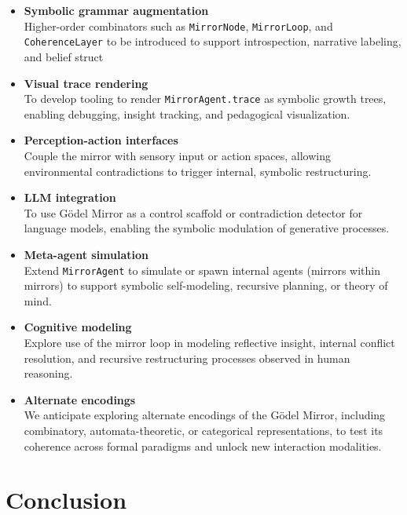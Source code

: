 \documentclass[manuscript,nonacm]{acmart}
\begin{document}
\begin{itemize}
\item \textbf{Symbolic grammar augmentation}\\
    Higher-order combinators such as \texttt{MirrorNode}, \texttt{MirrorLoop}, and \texttt{CoherenceLayer} to be introduced to support introspection, narrative labeling, and belief struct
    
\item \textbf{Visual trace rendering}\\
    To develop tooling to render \texttt{MirrorAgent.trace} as symbolic growth trees, enabling debugging, insight tracking, and pedagogical visualization.
    
\item \textbf{Perception-action interfaces}\\
    Couple the mirror with sensory input or action spaces, allowing environmental contradictions to trigger internal, symbolic restructuring.
    
\item \textbf{LLM integration}\\
    To use Gödel Mirror as a control scaffold or contradiction detector for language models, enabling the symbolic modulation of generative processes.
    
\item \textbf{Meta-agent simulation}\\
    Extend \texttt{MirrorAgent} to simulate or spawn internal agents (mirrors within mirrors) to support symbolic self-modeling, recursive planning, or theory of mind.
    
\item \textbf{Cognitive modeling}\\
    Explore use of the mirror loop in modeling reflective insight, internal conflict resolution, and recursive restructuring processes observed in human reasoning.
    
\item \textbf{Alternate encodings}\\
    We anticipate exploring alternate encodings of the Gödel Mirror, including combinatory, automata-theoretic, or categorical representations, to test its coherence across formal paradigms and unlock new interaction modalities.
\end{itemize}

\section{Conclusion}
\end{document}
